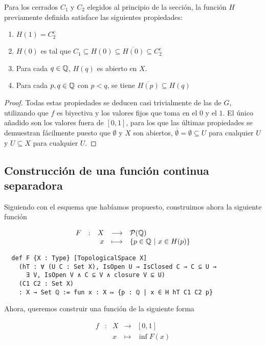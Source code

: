 \begin{lemma}
  Para los cerrados $C_1$ y $C_2$ elegidos al principio de la sección, la función $H$ previamente definida satisface las siguientes propiedades:
  \begin{enumerate}
    \item $H(1) = C_2^c$
    \item $H(0)$ es tal que $C_1 \subseteq H(0) \subseteq \overline{H(0)} \subseteq C_2^c$
    \item Para cada $q \in \mathbb{Q}$, $H(q)$ es abierto en $X$.
    \item Para cada $p, q \in \mathbb{Q}$ con $p < q$, se tiene $\overline{H(p)} \subseteq H(q)$
  \end{enumerate}
\end{lemma}

\begin{proof}
  Todas estas propiedades se deducen casi trivialmente de las de $G$, utilizando que $f$ es biyectiva y los valores fijos que toma en el $0$ y el $1$. El único añadido son los valores fuera de $[0, 1]$, para los que las últimas propiedades se demuestran fácilmente puesto que $\emptyset$ y $X$ son abiertos, $\overline{\emptyset} = \emptyset \subseteq U$ para cualquier $U$ y $U \subseteq X$ para cualquier $U$.
\end{proof}

\subsection{Construcción de una función continua separadora}

Siguiendo con el esquema que habíamos propuesto, construimos ahora la siguiente función

$$
\begin{array}{rcrcl}
  F & : & X & \longrightarrow & \mathcal{P}(\mathbb{Q}) \\
    & & x & \longmapsto & \{p \in \mathbb{Q} ~|~ x \in H(p)\}
\end{array}
$$

\begin{lstlisting}
  def F {X : Type} [TopologicalSpace X]
    (hT : ∀ (U C : Set X), IsOpen U → IsClosed C → C ⊆ U →
      ∃ V, IsOpen V ∧ C ⊆ V ∧ closure V ⊆ U)
    (C1 C2 : Set X)
    : X → Set ℚ := fun x : X ↦ {p : ℚ | x ∈ H hT C1 C2 p}
\end{lstlisting}

Ahora, queremos construir una función de la siguiente forma

$$
\begin{array}{rcrcl}
  f & : & X & \longrightarrow & [0, 1] \\
    & & x & \longmapsto & \inf F(x)
\end{array}
$$

